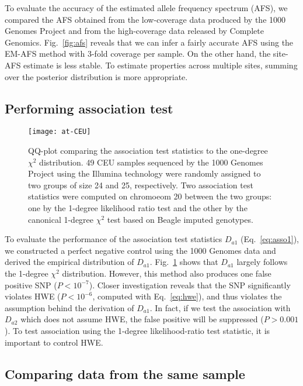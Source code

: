 \documentclass{bioinfo}
\begin{document}
To evaluate the accuracy of the estimated allele frequency spectrum (AFS), we
compared the AFS obtained from the low-coverage data produced by the 1000
Genomes Project and from the high-coverage data released by Complete Genomics.
Fig.~\ref{fig:afs} reveals that we can infer a fairly accurate AFS using the
EM-AFS method with 3-fold coverage per sample. On the other hand, the site-AFS
estimate is less stable.  To estimate properties across multiple sites, summing
over the posterior distribution is more appropriate.

\subsection{Performing association test}
\begin{figure}[tb]
\centering
\texttt{[image: at-CEU]}
\caption{QQ-plot comparing the association test statistics to the one-degree
$\chi^2$ distribution.
49 CEU samples sequenced by the 1000 Genomes Project using the Illumina
technology were randomly assigned to two groups of size 24 and 25,
respectively.  Two association test statistics were computed on chromoeom 20
between the two groups: one by the 1-degree likelihood ratio test and the other
by the canonical 1-degree $\chi^2$ test based on Beagle imputed
genotypes.}\label{fig:at}
\end{figure}

To evaluate the performance of the association test statistics $D_{a1}$
(Eq.~\eqref{eq:asso1}), we constructed a perfect negative control using the
1000 Genomes data and derived the empirical distribution of $D_{a1}$.
Fig.~\ref{fig:at} shows that $D_{a1}$ largely follows the 1-degree $\chi^2$
distribution.  However, this method also produces one false positive SNP
($P<10^{-7}$). Closer investigation reveals that the SNP significantly violates
HWE ($P<10^{-6}$, computed with Eq.~\eqref{eq:hwe}), and thus violates the
assumption behind the derivation of $D_{a1}$.  In fact, if we test the
association with $D_{a2}$ which does not assume HWE, the false positive will be
suppressed ($P>0.001$). To test association using the 1-degree likelihood-ratio
test statistic, it is important to control HWE.

\subsection{Comparing data from the same sample}
\end{document}

